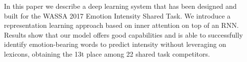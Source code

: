 In this paper we describe a deep learning system that has been designed and built for the WASSA 2017 Emotion Intensity Shared Task. We introduce a representation learning approach based on inner attention on top of an RNN. Results show that our model offers good capabilities and is able to successfully identify emotion-bearing words to predict intensity without leveraging on lexicons, obtaining the 13t place among 22 shared task competitors.
